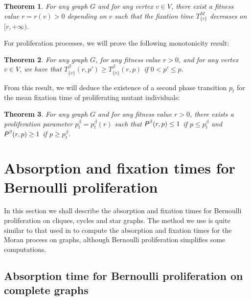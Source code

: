 \documentclass[a4paper,english,10pt]{amsart}
\newcommand{\Rho}{\emph{\textsf{P\hspace{0.1ex}}}}
\newtheorem{theorem}{\bf Theorem}[section]
\theoremstyle{definition}
\numberwithin{equation}{section}
\begin{document}
\begin{theorem} \label{thm:decreaseMoran}
For any graph $G$ and for any vertex $v \in V$, there exist a fitness value $r = r(v) > 0$ depending on $v$ such that the fixation time $T^M_{\{v\}}$ decreases on $[r,+\infty)$. 
\end{theorem} 
For proliferation processes, we will prove the following monotonicity result: 
\begin{theorem} \label{thm:decreasebeta}
For any graph $G$, for any fitness value $r > 0$, and for any vertex $v \in V$, we have that 
$T^\beta_{\{v\}}(r,p') \geq T^\beta_{\{v\}}(r,p)$ 
if $0 < p' \leq p$.  
\end{theorem}
From this result, we will deduce the existence of a second phase transition $p_t$ for the mean fixation time of proliferating mutant individuals: 
\begin{theorem} \label{thm:ptbeta}
For any graph $G$ and for any fitness value $r > 0$, there exists a prolife\-ration parameter $p^\beta_t = p^\beta_t(r)$ such that 
$\Rho^\beta(r,p) \leq 1$ if $p \leq p^\beta_t$ and 
$\Rho^\beta(r,p) \geq 1$ if $p \geq p^\beta_t$.
\end{theorem}


\section{Absorption and fixation times for Bernoulli proliferation}
\label{SBernoulli}

In this section we shall describe the absorption and fixation times for Bernoulli proliferation on cliques, cycles and star graphs. The method we use is quite similar to that used in \cite{BHR,H} to compute the absorption and fixation times for the Moran process on graphs, although Bernoulli proliferation simplifies some computations. %

\subsection{Absorption time for Bernoulli proliferation on complete graphs}
\end{document}

